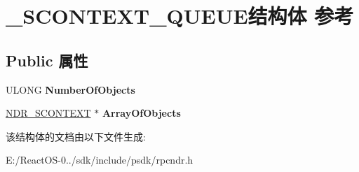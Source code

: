 \hypertarget{struct___s_c_o_n_t_e_x_t___q_u_e_u_e}{}\section{\+\_\+\+S\+C\+O\+N\+T\+E\+X\+T\+\_\+\+Q\+U\+E\+U\+E结构体 参考}
\label{struct___s_c_o_n_t_e_x_t___q_u_e_u_e}
\subsection*{Public 属性}
\begin{DoxyCompactItemize}
\item 
\mbox{\label{struct___s_c_o_n_t_e_x_t___q_u_e_u_e_a4167890999aae998e985ca52cbca5057}} 
U\+L\+O\+NG {\bfseries Number\+Of\+Objects}
\item 
\mbox{\label{struct___s_c_o_n_t_e_x_t___q_u_e_u_e_a7c8291a347c3a1c8a0012f023a4a126f}} 
\hyperlink{structtag_n_d_r___s_c_o_n_t_e_x_t}{N\+D\+R\+\_\+\+S\+C\+O\+N\+T\+E\+XT} $\ast$ {\bfseries Array\+Of\+Objects}
\end{DoxyCompactItemize}


该结构体的文档由以下文件生成\+:\begin{DoxyCompactItemize}
\item 
E\+:/\+React\+O\+S-\/0../sdk/include/psdk/rpcndr.\+h\end{DoxyCompactItemize}
